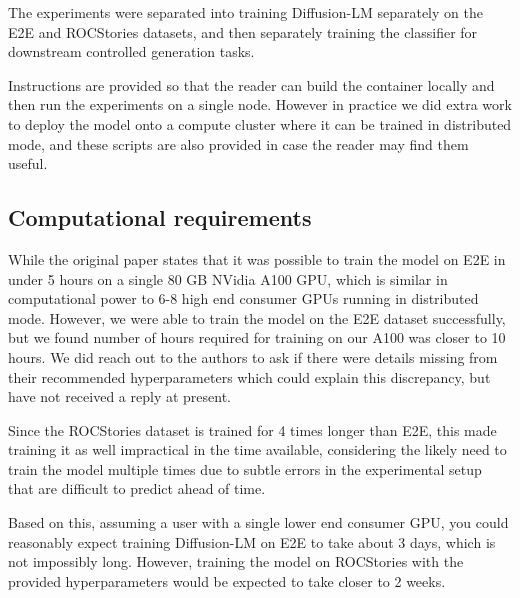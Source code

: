 The experiments were separated into training Diffusion-LM separately on the E2E and ROCStories datasets, and then separately training the classifier for downstream controlled generation tasks.

Instructions are provided so that the reader can build the container locally and then run the experiments on a single node. However in practice we did extra work to deploy the model onto a compute cluster where it can be trained in distributed mode, and these scripts are also provided in case the reader may find them useful.

\subsection{Computational requirements}

While the original paper states that it was possible to train the model on E2E in under 5 hours on a single 80 GB NVidia A100 GPU, which is similar in computational power to 6-8 high end consumer GPUs running in distributed mode. However, we were able to train the model on the E2E dataset successfully, but we found number of hours required for training on our A100 was closer to 10 hours. We did reach out to the authors to ask if there were details missing from their recommended hyperparameters which could explain this discrepancy, but have not received a reply at present.

Since the ROCStories dataset is trained for 4 times longer than E2E, this made training it as well impractical in the time available, considering the likely need to train the model multiple times due to subtle errors in the experimental setup that are difficult to predict ahead of time.

Based on this, assuming a user with a single lower end consumer GPU, you could reasonably expect training Diffusion-LM on E2E to take about 3 days, which is not impossibly long. However, training the model on ROCStories with the provided hyperparameters would be expected to take closer to 2 weeks.

